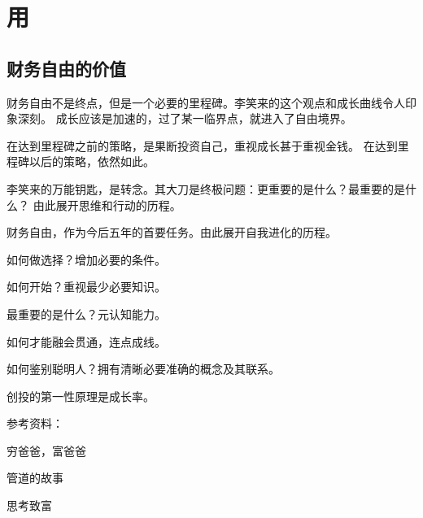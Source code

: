 \section{用}

\subsection{财务自由的价值}

财务自由不是终点，但是一个必要的里程碑。李笑来的这个观点和成长曲线令人印象深刻。
成长应该是加速的，过了某一临界点，就进入了自由境界。

在达到里程碑之前的策略，是果断投资自己，重视成长甚于重视金钱。
在达到里程碑以后的策略，依然如此。

李笑来的万能钥匙，是转念。其大刀是终极问题：更重要的是什么？最重要的是什么？
由此展开思维和行动的历程。

财务自由，作为今后五年的首要任务。由此展开自我进化的历程。

\begin{enumbox}
\item 如何做选择？增加必要的条件。
\item 如何开始？重视最少必要知识。
\item 最重要的是什么？元认知能力。
\item 如何才能融会贯通，连点成线。
\item 如何鉴别聪明人？拥有清晰必要准确的概念及其联系。
\item 创投的第一性原理是成长率。
\end{enumbox}

参考资料：
\begin{enumbox}
\item 穷爸爸，富爸爸
\item 管道的故事
\item 思考致富
\end{enumbox}
